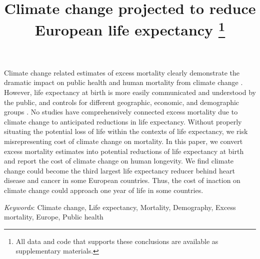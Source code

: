 \documentclass[12pt,]{article}
\title{Climate change projected to reduce European life expectancy \thanks{All data and code that supports these conclusions are available as
supplementary materials.}  }
\author{}
\date{}
\renewenvironment{abstract}
 {{%
    \setlength{\leftmargin}{0mm}
    \setlength{\rightmargin}{\leftmargin}%
  }%
  \relax}
 {\endlist}
\begin{document}
	
%

{%
\setlength{\parindent}{0pt}
\thispagestyle{plain}
{\fontsize{18}{20}\selectfont\raggedright 
\maketitle  %

}

{
   \vskip 13.5pt\relax \normalsize\fontsize{11}{12} 
 

}

}








\begin{abstract}

    \hbox{\vrule height .2pt width 39.14pc}

    \vskip 8.5pt %

\noindent Climate change related estimates of excess mortality clearly demonstrate
the dramatic impact on public health and human mortality from climate
change
\citep{patz2005impact, aastrom2013attributing, forzieri2017increasing, staddon2014climate}.
However, life expectancy at birth is more easily communicated and
understood by the public, and controls for different geographic,
economic, and demographic groups \citep{parrish2010peer}. No studies
have comprehensively connected excess mortality due to climate change to
anticipated reductions in life expectancy. Without properly situating
the potential loss of life within the contexts of life expectancy, we
risk misrepresenting cost of climate change on mortality. In this paper,
we convert excess mortality estimates into potential reductions of life
expectancy at birth and report the cost of climate change on human
longevity. We find climate change could become the third largest life
expectancy reducer behind heart disease and cancer in some European
countries. Thus, the cost of inaction on climate change could approach
one year of life in some countries.


\vskip 8.5pt \noindent \emph{Keywords}: Climate change, Life expectancy, Mortality, Demography, Excess
mortality, Europe, Public health \par

    \hbox{\vrule height .2pt width 39.14pc}



\end{abstract}
\end{document}
